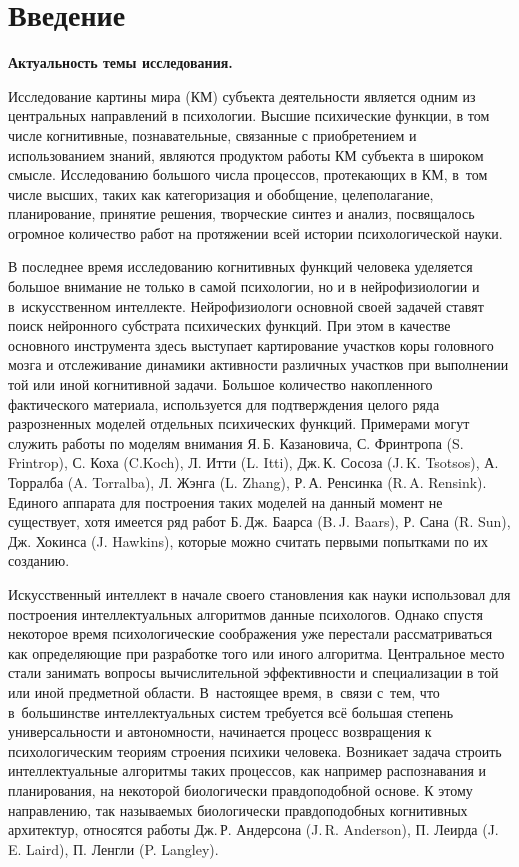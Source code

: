 \chapter*{Введение}							%
\textbf{Актуальность темы исследования.} 

Исследование картины мира (КМ) субъекта деятельности является одним из центральных направлений в психологии. Высшие психические функции, в том числе когнитивные, познавательные, связанные с приобретением и использованием знаний, являются продуктом работы КМ субъекта в широком смысле. Исследованию большого числа процессов, протекающих в КМ, в~том числе высших, таких как категоризация и обобщение, целеполагание, планирование, принятие решения, творческие синтез и анализ, посвящалось огромное количество работ на протяжении всей истории психологической науки.

В последнее время исследованию когнитивных функций человека уделяется большое внимание не только в самой психологии, но и в нейрофизиологии и в~искусственном интеллекте. Нейрофизиологи основной своей задачей ставят поиск нейронного субстрата психических функций. При этом в качестве основного инструмента здесь выступает картирование участков коры головного мозга и отслеживание динамики активности различных участков при выполнении той или иной когнитивной задачи. Большое количество накопленного фактического материала, используется для подтверждения целого ряда разрозненных моделей отдельных психических функций. Примерами могут служить работы по моделям внимания Я.\,Б. Казановича, С. Фринтропа (S. Frintrop), С. Коха (C.Koch), Л. Итти (L. Itti), Дж.\,К. Сосоза (J.\,K. Tsotsos), А. Торралба (A. Torralba), Л. Жэнга (L. Zhang), Р.\,А. Ренсинка (R.\,A. Rensink). Единого аппарата для построения таких моделей на данный момент не существует, хотя имеется ряд работ Б.\,Дж. Баарса (B.\,J. Baars), Р. Сана (R. Sun), Дж. Хокинса (J. Hawkins), которые можно считать первыми попытками по их созданию.

Искусственный интеллект в начале своего становления как науки использовал для построения интеллектуальных алгоритмов данные психологов. Однако спустя некоторое время психологические соображения уже перестали рассматриваться как определяющие при разработке того или иного алгоритма. Центральное место стали занимать вопросы вычислительной эффективности и специализации в той или иной предметной области. В~настоящее время, в~связи с~тем, что в~большинстве интеллектуальных систем требуется всё большая степень универсальности и автономности, начинается процесс возвращения к психологическим теориям строения психики человека. Возникает задача строить интеллектуальные алгоритмы таких процессов, как например распознавания и планирования, на некоторой биологически правдоподобной основе. К этому направлению, так называемых биологически правдоподобных когнитивных архитектур, относятся работы Дж.\,Р. Андерсона (J.\,R. Anderson), П. Леирда (J.\,E. Laird), П. Ленгли (P. Langley).

